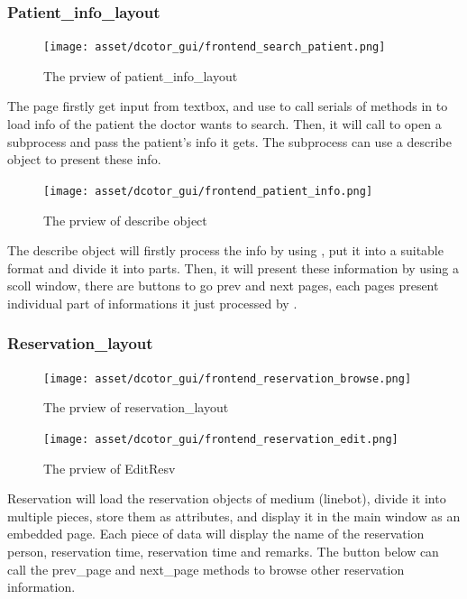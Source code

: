 \documentclass{article}
\begin{document}
\subsubsection*{Patient_info_layout}
\begin{figure}[h]
  \centering
  \texttt{[image: asset/dcotor\_gui/frontend\_search\_patient.png]}
  \caption{The prview of patient_info_layout}
  \label{fig:frontend_search_patient}
\end{figure}
The page firstly get input from textbox, and use  to call serials of methods in  to load info of the patient the doctor wants to search. Then, it will call  to open a subprocess and pass the patient's info it gets. The subprocess can use a describe object to present these info.
\begin{figure}[h]
  \centering
  \texttt{[image: asset/dcotor\_gui/frontend\_patient\_info.png]}
  \caption{The prview of describe object}
  \label{fig:frontend_patient_info}
\end{figure}
The describe object will firstly process the info by using , put it into a suitable format and divide it into parts.
Then, it will present these information by using a scoll window, there are buttons to go prev and next pages, each pages present individual part of informations it just processed by .

\subsubsection*{Reservation_layout}
\begin{figure}[h]
  \centering
  \texttt{[image: asset/dcotor\_gui/frontend\_reservation\_browse.png]}
  \caption{The prview of reservation_layout}
  \label{fig:frontend_reservation_browse}
\end{figure}

\begin{figure}[h]
  \centering
  \texttt{[image: asset/dcotor\_gui/frontend\_reservation\_edit.png]}
  \caption{The prview of EditResv}
  \label{fig:frontend_reservation_edit}
\end{figure}

Reservation will load the reservation objects of medium (linebot), divide it into multiple pieces, store them as attributes, and display it in the main window as an embedded page. Each piece of data will display the name of the reservation person, reservation time, reservation time and remarks. The button below can call the prev_page and next_page methods to browse other reservation information.
\end{document}
